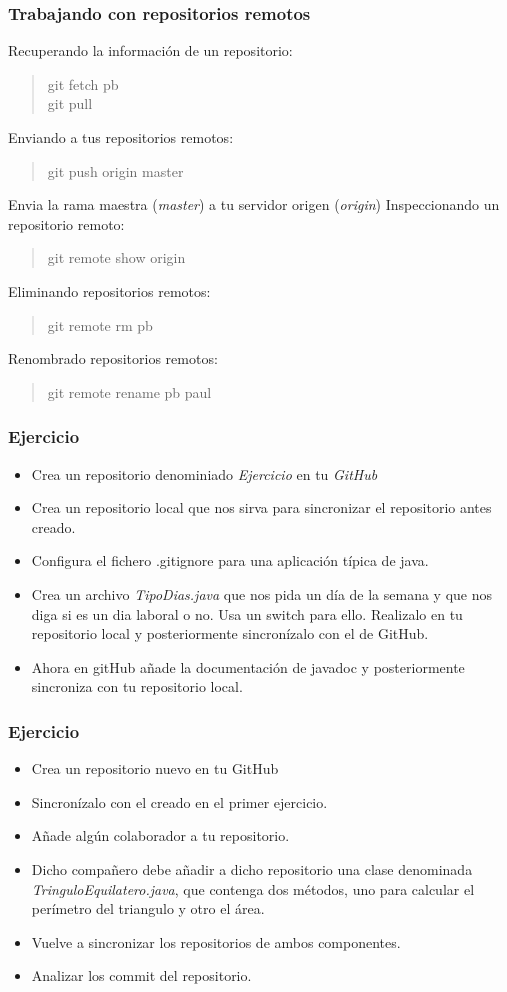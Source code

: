 \documentclass{beamer}
\begin{document}
\begin{frame}
\frametitle{Trabajando con repositorios remotos}
Recuperando la información de un repositorio:
\begin{verse}
git fetch pb\\
git pull
\end{verse}
\pause
Enviando a tus repositorios remotos:
\begin{verse}
git push origin master
\end{verse}
\pause
Envia la rama maestra (\emph{master}) a tu servidor origen (\emph{origin})
\pause
Inspeccionando un repositorio remoto:
\begin{verse}
git remote show origin
\end{verse}
\pause
Eliminando repositorios remotos:
\begin{verse}
git remote rm pb
\end{verse}
\pause
Renombrado repositorios remotos:
\begin{verse}
git remote rename pb paul
\end{verse}
\end{frame}

\begin{frame}[fragile]
\frametitle{Ejercicio}
\begin{itemize}[<+->]
\item Crea un repositorio denominiado \emph{Ejercicio} en tu \emph{GitHub}
\item Crea un repositorio local que nos sirva para sincronizar el repositorio antes creado.
\item Configura el fichero .gitignore para una aplicación típica de java.
\item Crea un archivo \emph{TipoDias.java} que nos pida un día de la semana y que nos diga si es un dia laboral o no. Usa un switch para ello. Realizalo en tu repositorio local y posteriormente sincronízalo con el de GitHub.
\item Ahora en gitHub añade la documentación de javadoc y posteriormente sincroniza con tu repositorio local.
\end{itemize}
\end{frame}

\begin{frame}[fragile]
\frametitle{Ejercicio}
\begin{itemize}[<+->]
\item Crea un repositorio nuevo en tu GitHub
\item Sincronízalo con el creado en el primer ejercicio.
\item Añade algún colaborador a tu repositorio.
\item Dicho compañero debe añadir a dicho repositorio una clase denominada \emph{TringuloEquilatero.java}, que contenga dos métodos, uno para calcular el perímetro del triangulo y otro el área.
\item Vuelve a sincronizar los repositorios de ambos componentes.
\item Analizar los commit del repositorio.
\end{itemize}
\end{frame}
\end{document}
